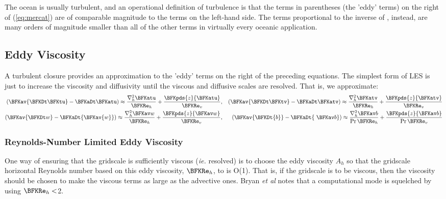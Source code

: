 The ocean is usually turbulent, and an operational definition of
turbulence is that the terms in parentheses (the 'eddy' terms) on the
right of (\ref{eq:mercat}) are of comparable magnitude to the terms on
the left-hand side.  The terms proportional to the inverse of \BFKRe,
instead, are many orders of magnitude smaller than all of the other
terms in virtually every oceanic application.

\subsection{Eddy Viscosity} 
A turbulent closure provides an approximation to the 'eddy' terms on
the right of the preceding equations.  The simplest form of LES is
just to increase the viscosity and diffusivity until the viscous and
diffusive scales are resolved.  That is, we approximate:
\begin{eqnarray}
\left({\BFKav{\BFKDt \BFKtu}}-{\BFKaDt \BFKatu}\right)
\approx\frac{\nabla^2_h{\BFKatu}}{\BFKRe_h}
+\frac{\BFKpds{z}{\BFKatu}}{\BFKRe_v}\label{eq:eddyvisc}, & &
\left({\BFKav{\BFKDt \BFKtv}}-{\BFKaDt \BFKatv}\right)
\approx\frac{\nabla^2_h{\BFKatv}}{\BFKRe_h}
+\frac{\BFKpds{z}{\BFKatv}}{\BFKRe_v}\nonumber\\
\left(\BFKav{\BFKDt w}-\BFKaDt {\BFKav{w}}\right)
\approx\frac{\nabla^2_h\BFKav w}{\BFKRe_h}
+\frac{\BFKpds{z}{\BFKav w}}{\BFKRe_v}\nonumber, & &
\left(\BFKav{\BFKDt{b}}-\BFKaDt{\ \BFKav b} \right)
\approx\frac{\nabla^2_h \BFKav b}{\Pr\BFKRe_h}
+\frac{\BFKpds{z} {\BFKav b}}{\Pr\BFKRe_v}\nonumber
\end{eqnarray}
   
\subsubsection{Reynolds-Number Limited Eddy Viscosity}   
One way of ensuring that the gridscale is sufficiently viscous
(\textit{ie.}  resolved) is to choose the eddy viscosity $A_h$ so that
the gridscale horizontal Reynolds number based on this eddy viscosity,
$\BFKRe_h$, to is O(1).  That is, if the gridscale is to be viscous,
then the viscosity should be chosen to make the viscous terms as large
as the advective ones.  Bryan \textit{et al} \cite{Bryanetal75} notes
that a computational mode is squelched by using $\BFKRe_h<$2.

